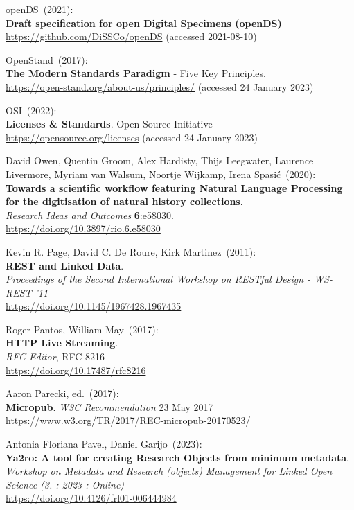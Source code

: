 \begin{thebibliography}{9}
openDS~(2021): \\
\textbf{Draft specification for open Digital Specimens (openDS)}\\
\url{https://github.com/DiSSCo/openDS} (accessed 2021-08-10)

OpenStand~(2017): \\
\textbf{The {Modern Standards Paradigm}} - {Five Key Principles}.\\
\url{https://open-stand.org/about-us/principles/} (accessed 24 January
2023)

OSI~(2022): \\
\textbf{Licenses \& {Standards}}.
Open Source Initiative\\
\url{https://opensource.org/licenses} (accessed 24 January 2023)

David Owen, Quentin Groom, Alex Hardisty, Thijs Leegwater, Laurence Livermore, Myriam van Walsum, Noortje Wijkamp, Irena Spasić~(2020): \\
\textbf{Towards a scientific workflow featuring Natural Language Processing for the digitisation of natural history collections}.\\
\emph{Research Ideas and Outcomes} \textbf{6}:e58030.\\
\url{https://doi.org/10.3897/rio.6.e58030}

Kevin R. Page, David C. De Roure, Kirk Martinez~(2011): \\
\textbf{{REST} and {Linked Data}}. \\
\emph{Proceedings of the {Second International Workshop} on {RESTful Design} - {WS-REST} '11} \\
\url{https://doi.org/10.1145/1967428.1967435}

Roger Pantos, William May~(2017): \\
\textbf{HTTP Live Streaming}. \\
\emph{RFC Editor}, RFC 8216\\
\url{https://doi.org/10.17487/rfc8216}

Aaron Parecki, ed.~(2017): \\
\textbf{Micropub}. 
\emph{W3C Recommendation} 23 May 2017\\
\url{https://www.w3.org/TR/2017/REC-micropub-20170523/}

Antonia Floriana Pavel, Daniel Garijo~(2023): \\
\textbf{Ya2ro: A tool for creating Research Objects from minimum metadata}.\\
\emph{Workshop on Metadata and Research (objects) Management for Linked Open Science (3. : 2023 : Online)}\\
\url{https://doi.org/10.4126/frl01-006444984}


\end{thebibliography}
